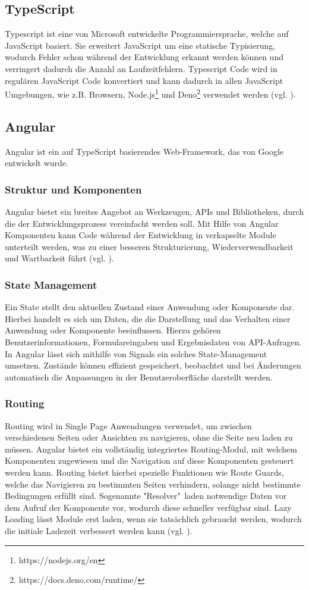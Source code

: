 \documentclass[oneside]{ausarbeitung}
\begin{document}
\subsection{TypeScript}
Typescript ist eine von Microsoft entwickelte Programmiersprache, welche auf JavaScript basiert. Sie erweitert JavaScript um eine statische Typisierung, wodurch Fehler schon während der Entwicklung erkannt werden können und verringert dadurch die Anzahl an Laufzeitfehlern. Typescript Code wird in regulären JavaScript Code konvertiert und kann dadurch in allen JavaScript Umgebungen, wie z.B. Browsern, Node.js\footnote{https://nodejs.org/en} und Deno\footnote{https://docs.deno.com/runtime/} verwendet werden (vgl. \parencite{typescript}). 

\subsection{Angular}
Angular ist ein auf TypeScript basierendes Web-Framework, das von Google entwickelt wurde. 

\subsubsection{Struktur und Komponenten}
Angular bietet ein breites Angebot an Werkzeugen, \ac{APIs} und Bibliotheken, durch die der Entwicklungsprozess vereinfacht werden soll. Mit Hilfe von Angular Komponenten kann Code während der Entwicklung in verkapselte Module unterteilt werden, was zu einer besseren Strukturierung, Wiederverwendbarkeit und Wartbarkeit führt (vgl. \parencite{angular}).

\subsubsection{State Management}
Ein State stellt den aktuellen Zustand einer Anwendung oder Komponente dar. Hierbei handelt es sich um Daten, die die Darstellung und das Verhalten einer Anwendung oder Komponente beeinflussen. Hierzu gehören Benutzerinformationen, Formulareingaben und Ergebnisdaten von API-Anfragen. 
In Angular lässt sich mithilfe von Signals ein solches State-Management umsetzen. Zustände können effizient gespeichert, beobachtet und bei Änderungen automatisch die Anpassungen in der Benutzeroberfläche darstellt werden. 
\subsubsection{Routing}
Routing wird in Single Page Anwendungen verwendet, um zwischen verschiedenen Seiten oder Ansichten zu navigieren, ohne die Seite neu laden zu müssen. Angular bietet ein vollständig integriertes Routing-Modul, mit welchem Komponenten zugewiesen und die Navigation auf diese Komponenten gesteuert werden kann. Routing bietet hierbei spezielle Funktionen wie Route Guards, welche das Navigieren zu bestimmten Seiten verhindern, solange nicht bestimmte Bedingungen erfüllt sind. Sogenannte "Resolver"\ laden notwendige Daten vor dem Aufruf der Komponente vor, wodurch diese schneller verfügbar sind. Lazy Loading lässt Module erst laden, wenn sie tatsächlich gebraucht werden, wodurch die initiale Ladezeit verbessert werden kann (vgl. \parencite{angular}).
\end{document}
